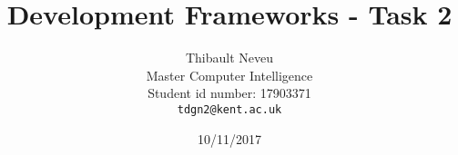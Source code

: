 
\title{Development Frameworks - Task 2}
\author{Thibault Neveu \\
  Master Computer Intelligence \\
  Student id number: 17903371 \\
  {\tt tdgn2@kent.ac.uk}}

\date{10/11/2017}
